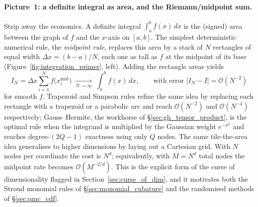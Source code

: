 \documentclass[11pt,a4paper]{report}
\begin{document}
\paragraph{Picture~1: a definite integral as area, and the Riemann/midpoint sum.}  Strip away the economics.  A definite integral $\int_a^b f(x)\,dx$ is the (signed) area between the graph of $f$ and the $x$-axis on $[a,b]$.  The simplest deterministic numerical rule, the \emph{midpoint rule}, replaces this area by a stack of $N$ rectangles of equal width $\Delta x = (b-a)/N$, each one as tall as $f$ at the midpoint of its base (Figure~\ref{fig:integration_primer}, left).  Adding the rectangle areas yields
\begin{equation}
I_N = \Delta x \sum_{i=1}^{N} f\bigl(x_i^{\text{mid}}\bigr)
\;\xrightarrow[N \to \infty]{}\; \int_a^b f(x)\,dx,
\qquad \text{with error } |I_N - I| = \mathcal{O}(N^{-2})
\end{equation}
for smooth $f$.  Trapezoid and Simpson rules refine the same idea by replacing each rectangle with a trapezoid or a parabolic arc and reach $\mathcal{O}(N^{-2})$ and $\mathcal{O}(N^{-4})$ respectively; Gauss--Hermite, the workhorse of \S\ref{sec:gh_tensor_product}, is the optimal rule when the integrand is multiplied by the Gaussian weight $e^{-x^2}$ and reaches degree-$(2Q-1)$ exactness using only $Q$ nodes.  The same tile-the-area idea generalises to higher dimensions by laying out a Cartesian grid.  With $N$ nodes per coordinate the cost is $N^d$; equivalently, with $M=N^d$ total nodes the midpoint rate becomes $\mathcal{O}(M^{-2/d})$.  This is the explicit form of the curse of dimensionality flagged in Section~\ref{sec:curse_of_dim}, and it motivates both the Stroud monomial rules of \S\ref{sec:monomial_cubature} and the randomised methods of \S\ref{sec:qmc_cdf}.
\end{document}
